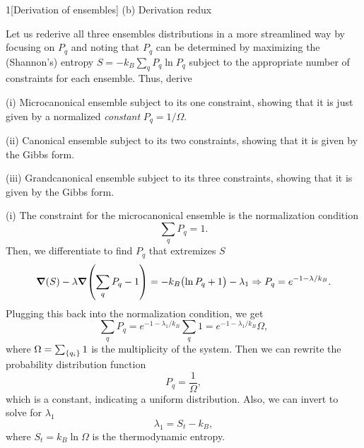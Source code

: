 \documentclass[12pt]{article}
\begin{document}
\begin{problem}{1}[Derivation of ensembles]
(b) Derivation redux

Let us rederive all three ensembles distributions in a more streamlined way by
focusing on $P_q$ and noting that $P_q$ can be determined by maximizing the
(Shannon's) entropy $S=-k_B\sum_qP_q\ln P_q$ subject to the appropriate number
of constraints for each ensemble. Thus, derive

\qquad(i) Microcanonical ensemble subject to its one constraint, showing that it
is just given by a normalized \textit{constant} $P_q=1/\Omega$.

\qquad(ii) Canonical ensemble subject to its two constraints, showing that it 
is given by the Gibbs form.

\qquad(iii) Grandcanonical ensemble subject to its three constraints, showing
that it is given by the Gibbs form.
\begin{solution}
\qquad(i) The constraint for the microcanonical ensemble is the normalization
condition
\begin{equation}\label{p1b:normalization_condition}
    \sum_qP_q=1 .
\end{equation}
Then, we differentiate to find $P_q$ that extremizes $S$
\begin{equation}
   \grad(S)-\lambda\grad\qty(\sum_qP_q-1)
   =-k_B\qty(\ln P_q+1)-\lambda_1
   \Rightarrow P_q=e^{-1-\lambda/k_B}.
\end{equation}
Plugging this back into the normalization condition, we get
\begin{equation}
    \sum_qP_q=e^{-1-\lambda_1/k_B}\sum_q1
    =e^{-1-\lambda_1/k_B}\Omega,
\end{equation}
where $\Omega=\sum_\qty{q_i}1$ is the multiplicity of the system. Then we can
rewrite the probability distribution function
\begin{equation}
    P_q=\frac1\Omega, 
\end{equation}
which is a constant, indicating a uniform distribution. Also, we can invert to
solve for $\lambda_1$
\begin{equation}
    \lambda_1=S_t-k_B, 
\end{equation}
where $S_t=k_B\ln\Omega$ is the thermodynamic entropy.


\end{solution}
\end{problem}
\end{document}
